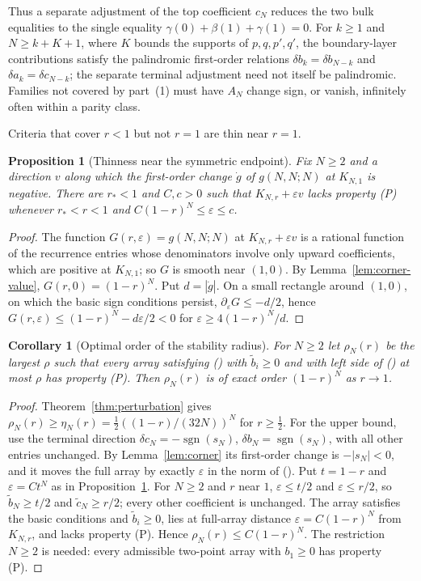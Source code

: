 \documentclass[twoside,10pt]{article}
\numberwithin{equation}{section}
\theoremstyle{slbody}
\newtheorem{corollary}[theorem]{Corollary}
\newtheorem{proposition}[theorem]{Proposition}
\theoremstyle{definition}
\theoremstyle{remark}
\renewcommand{\eqref}[1]{\textup{{\normalfont(\oldstylenums{\ref{#1}}}\normalfont)}}
\begin{document}
Thus a separate adjustment of the top coefficient $c_N$ reduces the two bulk equalities to the single equality $\gamma(0)+\beta(1)+\gamma(1)=0$. For $k\geq1$ and $N\geq k+K+1$, where $K$ bounds the supports of $p,q,p',q'$, the boundary-layer contributions satisfy the palindromic first-order relations $\delta b_k=\delta b_{N-k}$ and $\delta a_k=\delta c_{N-k}$; the separate terminal adjustment need not itself be palindromic. Families not covered by part~(1) must have $A_N$ change sign, or vanish, infinitely often within a parity class.

Criteria that cover $r<1$ but not $r=1$ are thin near $r=1$.

\begin{proposition}[Thinness near the symmetric endpoint]\label{prop:thin}
Fix $N\geq2$ and a direction $v$ along which the first-order change $\dot g$ of $g(N,N;N)$ at $K_{N,1}$ is negative. There are $r_*<1$ and $C,c>0$ such that $K_{N,r}+\varepsilon v$ lacks property (P) whenever $r_*<r<1$ and $C(1-r)^N\leq\varepsilon\leq c$.
\end{proposition}
\begin{proof}
The function $G(r,\varepsilon)=g(N,N;N)$ at $K_{N,r}+\varepsilon v$ is a rational function of the recurrence entries whose denominators involve only upward coefficients, which are positive at $K_{N,1}$; so $G$ is smooth near $(1,0)$. By Lemma~\ref{lem:corner-value}, $G(r,0)=(1-r)^N$. Put $d=|\dot g|$. On a small rectangle around $(1,0)$, on which the basic sign conditions persist, $\partial_\varepsilon G\leq-d/2$, hence $G(r,\varepsilon)\leq(1-r)^N-d\varepsilon/2<0$ for $\varepsilon\geq4(1-r)^N/d$.
\end{proof}

\begin{corollary}[Optimal order of the stability radius]\label{cor:radius-order}
For $N\geq2$ let $\rho_N(r)$ be the largest $\rho$ such that every array satisfying \eqref{eq:basic} with $\widetilde b_i\geq0$ and with left side of \eqref{eq:closeness} at most $\rho$ has property (P). Then $\rho_N(r)$ is of exact order $(1-r)^N$ as $r\to1$.
\end{corollary}
\begin{proof}
Theorem~\ref{thm:perturbation} gives $\rho_N(r)\geq\eta_N(r)=\tfrac12((1-r)/(32N))^N$ for $r\geq\tfrac12$. For the upper bound, use the terminal direction $\delta c_N=-\operatorname{sgn}(s_N)$, $\delta b_N=\operatorname{sgn}(s_N)$, with all other entries unchanged. By Lemma~\ref{lem:corner} its first-order change is $-|s_N|<0$, and it moves the full array by exactly $\varepsilon$ in the norm of \eqref{eq:closeness}. Put $t=1-r$ and $\varepsilon=Ct^N$ as in Proposition~\ref{prop:thin}. For $N\geq2$ and $r$ near $1$, $\varepsilon\leq t/2$ and $\varepsilon\leq r/2$, so $\widetilde b_N\geq t/2$ and $\widetilde c_N\geq r/2$; every other coefficient is unchanged. The array satisfies the basic conditions and $\widetilde b_i\geq0$, lies at full-array distance $\varepsilon=C(1-r)^N$ from $K_{N,r}$, and lacks property (P). Hence $\rho_N(r)\leq C(1-r)^N$. The restriction $N\geq2$ is needed: every admissible two-point array with $b_1\geq0$ has property (P).
\end{proof}
\end{document}
